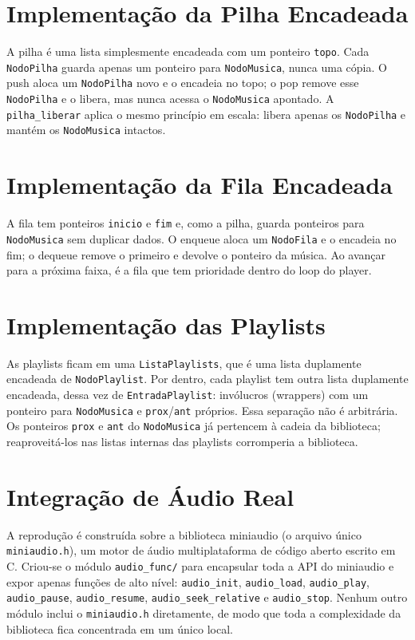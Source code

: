 \documentclass[
    12pt
    ,oneside
    ,a4paper
    ,chapter=TITLE
    ,section=TITLE
    ,sumario=abnt-6027-2012]{abntex2}
\begin{document}
\section{Implementação da Pilha Encadeada}

A pilha é uma lista simplesmente encadeada com um ponteiro \texttt{topo}. Cada \texttt{NodoPilha} guarda apenas um ponteiro para \texttt{NodoMusica}, nunca uma cópia. O push aloca um \texttt{NodoPilha} novo e o encadeia no topo; o pop remove esse \texttt{NodoPilha} e o libera, mas nunca acessa o \texttt{NodoMusica} apontado. A \texttt{pilha\_liberar} aplica o mesmo princípio em escala: libera apenas os \texttt{NodoPilha} e mantém os \texttt{NodoMusica} intactos.

\section{Implementação da Fila Encadeada}

A fila tem ponteiros \texttt{inicio} e \texttt{fim} e, como a pilha, guarda ponteiros para \texttt{NodoMusica} sem duplicar dados. O enqueue aloca um \texttt{NodoFila} e o encadeia no fim; o dequeue remove o primeiro e devolve o ponteiro da música. Ao avançar para a próxima faixa, é a fila que tem prioridade dentro do loop do player.

\section{Implementação das Playlists}

As playlists ficam em uma \texttt{ListaPlaylists}, que é uma lista duplamente encadeada de \texttt{NodoPlaylist}. Por dentro, cada playlist tem outra lista duplamente encadeada, dessa vez de \texttt{EntradaPlaylist}: invólucros (wrappers) com um ponteiro para \texttt{NodoMusica} e \texttt{prox}/\texttt{ant} próprios. Essa separação não é arbitrária. Os ponteiros \texttt{prox} e \texttt{ant} do \texttt{NodoMusica} já pertencem à cadeia da biblioteca; reaproveitá-los nas listas internas das playlists corromperia a biblioteca.

\section{Integração de Áudio Real}

A reprodução é construída sobre a biblioteca miniaudio \cite{reid2024miniaudio} (o arquivo único \texttt{miniaudio.h}), um motor de áudio multiplataforma de código aberto escrito em C. Criou-se o módulo \texttt{audio\_func/} para encapsular toda a API do miniaudio e expor apenas funções de alto nível: \texttt{audio\_init}, \texttt{audio\_load}, \texttt{audio\_play}, \texttt{audio\_pause}, \texttt{audio\_resume}, \texttt{audio\_seek\_relative} e \texttt{audio\_stop}. Nenhum outro módulo inclui o \texttt{miniaudio.h} diretamente, de modo que toda a complexidade da biblioteca fica concentrada em um único local.
\end{document}
